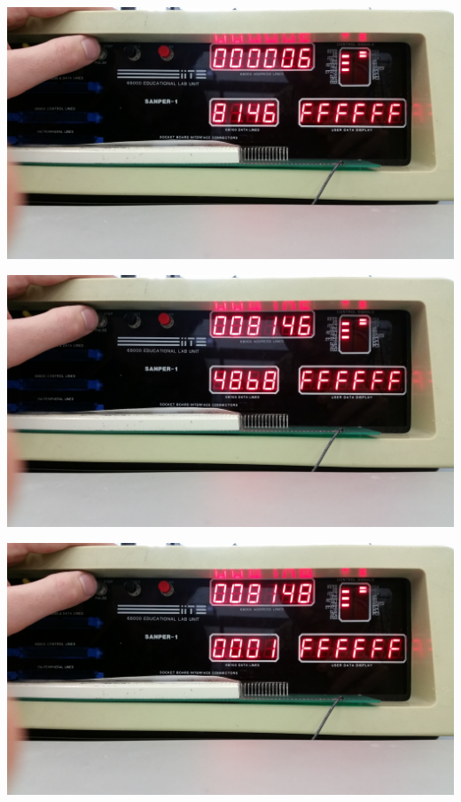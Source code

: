 \documentclass[12pt, twocolumn]{article}
\begin{document}
\begin{center}
\includegraphics[width=1\linewidth]{Lab1/20150120_095005}
\end{center}
\begin{center}
\includegraphics[width=1\linewidth]{Lab1/20150120_095007}
\end{center}
\begin{center}
\includegraphics[width=1\linewidth]{Lab1/20150120_095009}
\end{center}
\end{document}
